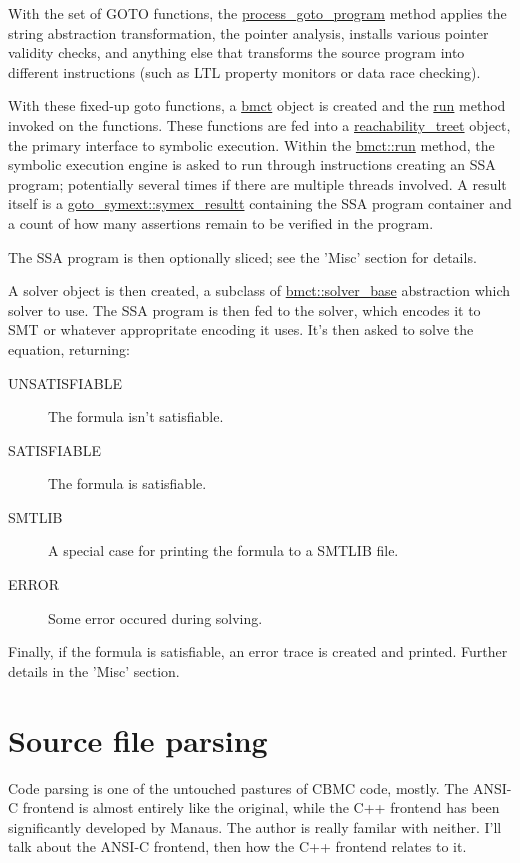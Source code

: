 \documentclass{article}
\begin{document}
With the set of GOTO functions, the \url{process_goto_program} method
applies the string abstraction transformation, the pointer analysis,
installs various pointer validity checks, and anything else that transforms
the source program into different instructions (such as LTL property monitors
or data race checking).

With these fixed-up goto functions, a \url{bmct} object is created and the
\url{run} method invoked on the functions. These functions are fed into a
\url{reachability_treet} object, the primary interface to symbolic
execution. Within the \url{bmct::run} method, the symbolic execution engine
is asked to run through instructions creating an SSA program; potentially
several times if there are multiple threads involved. A result itself is a
\url{goto_symext::symex_resultt} containing the SSA program container and
a count of how many assertions remain to be verified in the program.

The SSA program is then optionally sliced; see the 'Misc' section for details.

A solver object is then created, a subclass of \url{bmct::solver_base}
abstraction which solver to use. The SSA program is then fed to the solver,
which encodes it to SMT or whatever appropritate encoding it uses. It's then
asked to solve the equation, returning:
\begin{description}
\item[UNSATISFIABLE] The formula isn't satisfiable.
\item[SATISFIABLE] The formula is satisfiable.
\item[SMTLIB] A special case for printing the formula to a SMTLIB file.
\item[ERROR] Some error occured during solving.
\end{description}

Finally, if the formula is satisfiable, an error trace is created and printed.
Further details in the 'Misc' section.

\section{Source file parsing}

Code parsing is one of the untouched pastures of CBMC code, mostly. The ANSI-C
frontend is almost entirely like the original, while the C++ frontend has been
significantly developed by Manaus. The author is really familar with neither.
I'll talk about the ANSI-C frontend, then how the C++ frontend relates to it.
\end{document}
